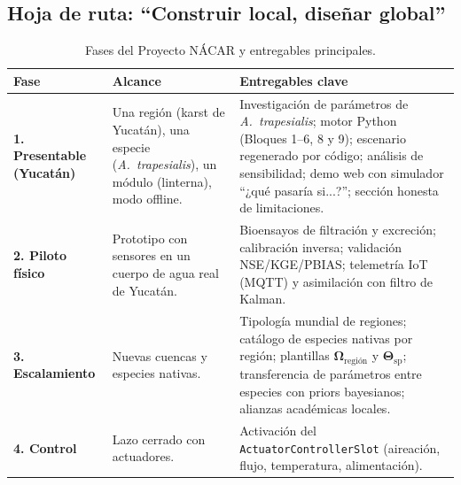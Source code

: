 \documentclass[11pt,letterpaper]{article}
\begin{document}
\subsection{Hoja de ruta: ``Construir local, diseñar global''}
\begin{table}[htbp]
\centering
\caption{Fases del Proyecto NÁCAR y entregables principales.}
\label{tab:fases}
\vspace{0.15cm}
\small
\begin{tabularx}{\textwidth}{l X X}
\hline
\textbf{Fase} & \textbf{Alcance} & \textbf{Entregables clave} \\
\hline
\textbf{1. Presentable (Yucatán)} & Una región (karst de Yucatán), una especie (\textit{A.\ trapesialis}), un módulo (linterna), modo offline. & Investigación de parámetros de \textit{A.\ trapesialis}; motor Python (Bloques 1--6, 8 y 9); escenario regenerado por código; análisis de sensibilidad; demo web con simulador ``¿qué pasaría si...?''; sección honesta de limitaciones. \\
\textbf{2. Piloto físico} & Prototipo con sensores en un cuerpo de agua real de Yucatán. & Bioensayos de filtración y excreción; calibración inversa; validación NSE/KGE/PBIAS; telemetría IoT (MQTT) y asimilación con filtro de Kalman. \\
\textbf{3. Escalamiento} & Nuevas cuencas y especies nativas. & Tipología mundial de regiones; catálogo de especies nativas por región; plantillas $\boldsymbol{\Omega}_{\text{región}}$ y $\boldsymbol{\Theta}_{\text{sp}}$; transferencia de parámetros entre especies con priors bayesianos; alianzas académicas locales. \\
\textbf{4. Control} & Lazo cerrado con actuadores. & Activación del \texttt{ActuatorControllerSlot} (aireación, flujo, temperatura, alimentación). \\
\hline
\end{tabularx}
\end{table}
\end{document}
